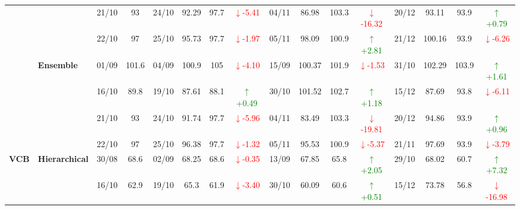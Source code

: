 {\begin{longtable}{llcc|cccc|cccc|cccc}
&
& 21/10 & 93 & 24/10 & 92.29 & 97.7 & \textcolor{red}{\(\downarrow\)-5.41} & 04/11 & 86.98 & 103.3 & \textcolor{red}{\(\downarrow\)-16.32} & 20/12 & 93.11 & 93.9 & \textcolor{green}{\(\uparrow\)+0.79} \\

&
& 22/10 & 97 & 25/10 & 95.73 & 97.7 & \textcolor{red}{\(\downarrow\)-1.97} & 05/11 & 98.09 & 100.9 & \textcolor{green}{\(\uparrow\)+2.81} & 21/12 & 100.16 & 93.9 & \textcolor{red}{\(\downarrow\)-6.26} \\
\cmidrule(lr){2-16}



& \textbf{Ensemble}
& 01/09 & 101.6 & 04/09 & 100.9 & 105 & \textcolor{red}{\(\downarrow\)-4.10} & 15/09 & 100.37 & 101.9 & \textcolor{red}{\(\downarrow\)-1.53} & 31/10 & 102.29 & 103.9 & \textcolor{green}{\(\uparrow\)+1.61} \\

&
& 16/10 & 89.8 & 19/10 & 87.61 & 88.1 & \textcolor{green}{\(\uparrow\)+0.49} & 30/10 & 101.52 & 102.7 & \textcolor{green}{\(\uparrow\)+1.18} & 15/12 & 87.69 & 93.8 & \textcolor{red}{\(\downarrow\)-6.11} \\

&
& 21/10 & 93 & 24/10 & 91.74 & 97.7 & \textcolor{red}{\(\downarrow\)-5.96} & 04/11 & 83.49 & 103.3 & \textcolor{red}{\(\downarrow\)-19.81} & 20/12 & 94.86 & 93.9 & \textcolor{green}{\(\uparrow\)+0.96} \\

&
& 22/10 & 97 & 25/10 & 96.38 & 97.7 & \textcolor{red}{\(\downarrow\)-1.32} & 05/11 & 95.53 & 100.9 & \textcolor{red}{\(\downarrow\)-5.37} & 21/11 & 97.69 & 93.9 & \textcolor{red}{\(\downarrow\)-3.79} \\
\midrule




\multirow{12}{*}{\textbf{VCB}} 
& \textbf{Hierarchical}
& 30/08 & 68.6 & 02/09 & 68.25 & 68.6 & \textcolor{red}{\(\downarrow\)-0.35} & 13/09 & 67.85 & 65.8 & \textcolor{green}{\(\uparrow\)+2.05} & 29/10 & 68.02 & 60.7 & \textcolor{green}{\(\uparrow\)+7.32} \\

&
& 16/10 & 62.9 & 19/10 & 65.3 & 61.9 & \textcolor{red}{\(\downarrow\)-3.40} & 30/10 & 60.09 & 60.6 & \textcolor{green}{\(\uparrow\)+0.51} & 15/12 & 73.78 & 56.8 & \textcolor{red}{\(\downarrow\)-16.98} \\


\end{longtable}}
